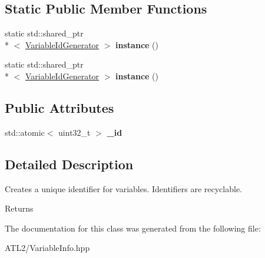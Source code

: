 \subsection*{Static Public Member Functions}
\begin{DoxyCompactItemize}
\item 
\hypertarget{classatl_1_1_variable_id_generator_a780b39026099c6556015bfc73f0cfc27}{static std\+::shared\+\_\+ptr\\*
$<$ \hyperlink{classatl_1_1_variable_id_generator}{Variable\+Id\+Generator} $>$ {\bfseries instance} ()}\label{classatl_1_1_variable_id_generator_a780b39026099c6556015bfc73f0cfc27}

\item 
\hypertarget{classatl_1_1_variable_id_generator_a1cf81533df4cdd7c6cc7a1d2f100388a}{static std\+::shared\+\_\+ptr\\*
$<$ \hyperlink{classatl_1_1_variable_id_generator}{Variable\+Id\+Generator} $>$ {\bfseries instance} ()}\label{classatl_1_1_variable_id_generator_a1cf81533df4cdd7c6cc7a1d2f100388a}

\end{DoxyCompactItemize}
\subsection*{Public Attributes}
\begin{DoxyCompactItemize}
\item 
\hypertarget{classatl_1_1_variable_id_generator_a5c8dd40ad503d55f82520ced39a9a5f0}{std\+::atomic$<$ uint32\+\_\+t $>$ {\bfseries \+\_\+id}}\label{classatl_1_1_variable_id_generator_a5c8dd40ad503d55f82520ced39a9a5f0}

\end{DoxyCompactItemize}


\subsection{Detailed Description}
Creates a unique identifier for variables. Identifiers are recyclable. \begin{DoxyReturn}{Returns}

\end{DoxyReturn}


The documentation for this class was generated from the following file\+:\begin{DoxyCompactItemize}
\item 
A\+T\+L2/Variable\+Info.\+hpp\end{DoxyCompactItemize}
